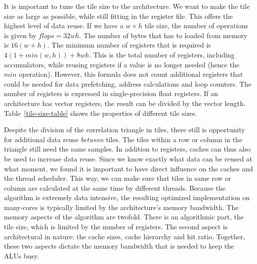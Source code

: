 \documentclass{article}
\begin{document}
It is important to tune the tile size to the architecture. We want to
make the tile size as large as possible, while still fitting in the
register file. This offers the highest level of data reuse.  
If we have a $w \times h$ tile size, the number of operations is given by $flops = 32wh$.
The number of bytes that has to loaded from memory is $16(w+h)$.
The minimum number of registers that is required is $4 (1 + min(w,h)) + 8 w h$.
This is the total number of registers, including accumulators, while reusing
registers if a value is no longer needed (hence the $min$ operation). However,
this formula does not count additional registers that could be needed for data prefetching,
address calculations and loop counters.
The number of registers is expressed in single-precision float registers. If an architecture has vector
registers, the result can be divided by the vector length.
Table~\ref{tile-size-table} shows the properties of different tile sizes. 

Despite the division of the correlation triangle in tiles, there
still is opportunity for additional data reuse \emph{between} tiles. 
The tiles
within a row or column in the triangle still need the same samples.
In
addition to registers, caches can thus also be used to increase data
reuse.  Since we know exactly what data can be reused at what moment, we
found it is important to have direct influence on the caches and the thread scheduler.  This
way, we can make sure that tiles in same row or column are calculated
at the same time by different threads. 
Because the algorithm is
extremely data intensive, the resulting optimized implementation on
many-cores is typically limited by the architecture's memory
bandwidth. The memory aspects of the algorithm are twofold.
There is an algorithmic part, the tile size, which is limited
by the number of registers. The second aspect is architectural in nature: the cache
sizes, cache hierarchy and hit ratio. Together, these two aspects dictate the
memory bandwidth that is needed to keep the ALUs busy.
\end{document}
